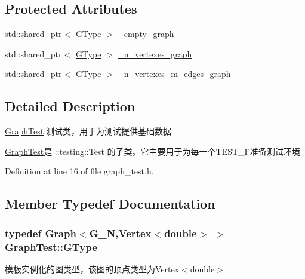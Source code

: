 \subsection*{Protected Attributes}
\begin{DoxyCompactItemize}
\item 
std\+::shared\+\_\+ptr$<$ \hyperlink{class_graph_test_a35200ea3d08690769c40550cba2ecd5a}{G\+Type} $>$ \hyperlink{class_graph_test_a1dbaf4ba93fa17246e6fef78b5dd678c}{\+\_\+empty\+\_\+graph}
\item 
std\+::shared\+\_\+ptr$<$ \hyperlink{class_graph_test_a35200ea3d08690769c40550cba2ecd5a}{G\+Type} $>$ \hyperlink{class_graph_test_a2dac828599509e577b5406d06f613a16}{\+\_\+n\+\_\+vertexes\+\_\+graph}
\item 
std\+::shared\+\_\+ptr$<$ \hyperlink{class_graph_test_a35200ea3d08690769c40550cba2ecd5a}{G\+Type} $>$ \hyperlink{class_graph_test_aaa662e57a6eb46a91c59464871b4907f}{\+\_\+n\+\_\+vertexes\+\_\+m\+\_\+edges\+\_\+graph}
\end{DoxyCompactItemize}


\subsection{Detailed Description}
\hyperlink{class_graph_test}{Graph\+Test}\+:测试类，用于为测试提供基础数据 

{\ttfamily \hyperlink{class_graph_test}{Graph\+Test}}是 {\ttfamily \+::testing\+::\+Test} 的子类。它主要用于为每一个{\ttfamily T\+E\+S\+T\+\_\+\+F}准备测试环境 

Definition at line 16 of file graph\+\_\+test.\+h.



\subsection{Member Typedef Documentation}
\hypertarget{class_graph_test_a35200ea3d08690769c40550cba2ecd5a}{}
\subsubsection[{G\+Type}]{\setlength{\rightskip}{0pt plus 5cm}typedef {\bf Graph}$<${\bf G\+\_\+\+N},{\bf Vertex}$<$double$>$ $>$ {\bf Graph\+Test\+::\+G\+Type}}\label{class_graph_test_a35200ea3d08690769c40550cba2ecd5a}
模板实例化的图类型，该图的顶点类型为{\ttfamily Vertex$<$double$>$} 

